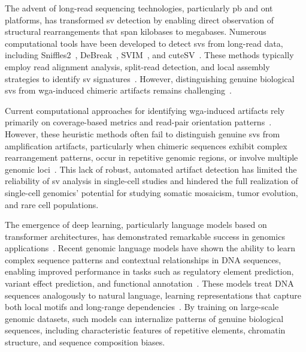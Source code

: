 \documentclass[pdflatex,sn-nature,lineno]{sn-jnl}%
\theoremstyle{thmstyleone}%
\theoremstyle{thmstyletwo}%
\theoremstyle{thmstylethree}%
\begin{document}
The advent of long-read sequencing technologies, particularly \gls{pb} and \gls{ont} platforms, has transformed \gls{sv} detection by enabling direct observation of structural rearrangements that span kilobases to megabases.
Numerous computational tools have been developed to detect \glspl{sv} from long-read data, including
Sniffles2~\cite{Sedlazeck2018,Smolka2024}, DeBreak~\cite{chen2023deciphering}, SVIM~\cite{heller2019svim}, and cuteSV~\cite{jiang2020longreadbased}.
These methods typically employ read alignment analysis, split-read detection, and local assembly strategies to identify \gls{sv} signatures~\cite{alkan2011genome}.
However, distinguishing genuine biological \glspl{sv} from \gls{wga}-induced chimeric artifacts remains challenging~\cite{kiguchi2021longread,lu2023exploration,kosugi2019comprehensive,mahmoud2019structural}.

Current computational approaches for identifying \gls{wga}-induced artifacts rely primarily on coverage-based metrics and read-pair orientation patterns~\cite{kiguchi2021longread, lu2023exploration}.
However, these heuristic methods often fail to distinguish genuine \glspl{sv} from amplification artifacts, particularly when chimeric sequences exhibit complex rearrangement patterns, occur in repetitive genomic regions, or involve multiple genomic loci~\cite{kosugi2019comprehensive,mahmoud2019structural}.
This lack of robust, automated artifact detection has limited the reliability of \gls{sv} analysis in single-cell studies and hindered the full realization of single-cell genomics' potential for studying somatic mosaicism, tumor evolution, and rare cell populations.

The emergence of deep learning, particularly language models based on transformer architectures, has demonstrated remarkable success in genomics applications~\cite{dalla2025nucleotide,zhou2023dnabert,nguyen2023hyenadna, consens2023transformers}.
Recent genomic language models have shown the ability to learn complex sequence patterns and contextual relationships in DNA sequences, enabling improved performance in tasks such as regulatory element prediction, variant effect prediction, and functional annotation~\cite{consens2023transformers,routhier2022genomics}.
These models treat DNA sequences analogously to natural language, learning representations that capture both local motifs and long-range dependencies~\cite{dalla2025nucleotide}.
By training on large-scale genomic datasets, such models can internalize patterns of genuine biological sequences, including characteristic features of repetitive elements, chromatin structure, and sequence composition biases.
\end{document}
